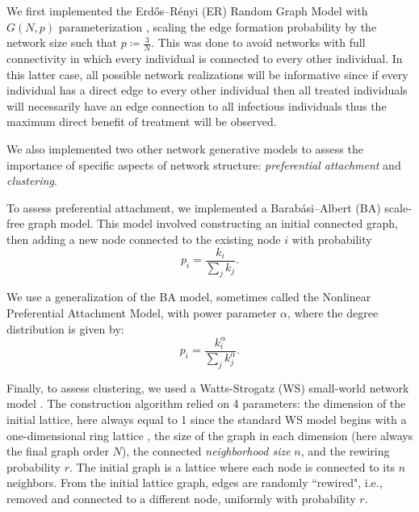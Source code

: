 \documentclass{article}
\theoremstyle{definition}
\begin{document}
We first implemented the  Erdős–Rényi (ER) Random Graph Model with $G(N,p)$ parameterization \cite{barabasi_network_2016}, scaling the edge formation probability by the network size such that $p \coloneqq \frac{3}{N}$. This was done to avoid networks with full connectivity in which every individual is connected to every other individual. In this latter case, all possible network realizations will be informative since if every individual has a direct edge to every other individual then all treated individuals will necessarily have an edge connection to all infectious individuals thus the maximum direct benefit of treatment will be observed. 

We also implemented two other network generative models to assess the importance of specific aspects of network structure: \textit{preferential attachment} and \textit{clustering}. 

To assess preferential attachment, we implemented a Barabási–Albert (BA) scale-free graph model\cite{barabasi_network_2016}. This model involved constructing an initial connected graph, then adding a new node connected to the existing node $i$ with probability 
\begin{equation*}
    p_{i}=\frac{k_{i}}{\sum_{j}k_{j}}.
\end{equation*}

We use a generalization of the BA model, sometimes called the Nonlinear Preferential Attachment Model, with power parameter $\alpha$, where the degree distribution is given by:
\begin{equation*}
    p_{i}=\frac{k_{i}^{\alpha}}{\sum_{j}k_{j}^{\alpha}}.
\end{equation*}

Finally, to assess clustering, we used a Watts-Strogatz (WS) small-world network model \cite{watts_collective_1998}. The construction algorithm relied on 4 parameters: the dimension of the initial lattice, here always equal to 1 since the standard WS model begins with a one-dimensional ring lattice \cite{barrat_properties_2000}, the size of the graph in each dimension (here always the final graph order $N$), the connected \textit{neighborhood size} $n$, and the rewiring probability $r$. The initial graph is a lattice where each node is connected to its $n$ neighbors. From the initial lattice graph, edges are randomly ``rewired", i.e., removed and connected to a different node, uniformly with probability $r$.
\end{document}
